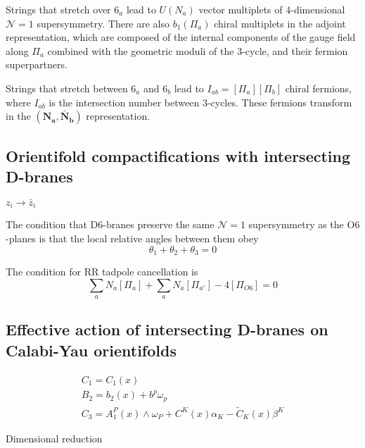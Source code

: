 Strings that stretch over $6_a$ lead to $U(N_a)$ vector multiplets of 4-dimensional $\mathcal N=1$ supersymmetry.
There are also $b_1(\Pi_a)$ chiral multiplets in the adjoint representation,
which are composed of the internal components of the gauge field along $\Pi_a$ combined with 
the geometric moduli of the $3$-cycle, and their fermion superpartners.

Strings that stretch between $6_a$ and $6_b$ lead to $I_{ab}=[\Pi_a][\Pi_b]$ chiral fermions, where $I_{ab}$ 
is the intersection number between $3$-cycles. These fermions transform in the $(\mathbf{N_a},\mathbf{\bar N_b})$ representation.

\subsection{Orientifold compactifications with intersecting D-branes}

$z_i \to \bar z_i$

The condition that D$6$-branes preserve the same $\mathcal N=1$ supersymmetry as the O$6$-planes
is that the local relative angles between them obey
\begin{equation}
  \theta_1 + \theta_2 + \theta_3 = 0
\end{equation}

The condition for RR tadpole cancellation is
\begin{equation}
  \sum_a N_a [\Pi_a] + \sum_a N_{a} [\Pi_{a'}] - 4 [\Pi_{O6}]=0
\end{equation}


\subsection{Effective action of intersecting D-branes on Calabi-Yau orientifolds}

\begin{equation}
\begin{aligned}
C_1 = C_1(x)\\
B_2 = b_2(x)+b^p \omega_p \\
C_3 = A_1^P(x)\wedge \omega_P + C^K(x)\alpha_K -\tilde C_K(x)\beta^K
\end{aligned}
\end{equation}


Dimensional reduction

